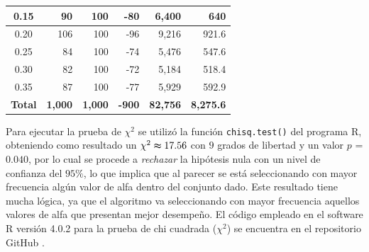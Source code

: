 \documentclass{article}
\begin{document}
\begin{table}
\begin{tabular}{|c|r|r|r|r|r|}
0.15                                 & 90                                                                             & 100                                                                           & -80                      & 6,400                          & 640                              \\ \hline
0.20                                 & 106                                                                            & 100                                                                           & -96                      & 9,216                          & 921.6                            \\ \hline
0.25                                 & 84                                                                             & 100                                                                           & -74                      & 5,476                          & 547.6                            \\ \hline
0.30                                 & 82                                                                             & 100                                                                           & -72                      & 5,184                          & 518.4                            \\ \hline
0.35                                 & 87                                                                             & 100                                                                           & -77                      & 5,929                          & 592.9                            \\ \hline
\multicolumn{1}{|l|}{\textbf{Total}} & \textbf{1,000}                                                                 & \textbf{1,000}                                                                  & \textbf{-900}            & \textbf{82,756}                & \textbf{8,275.6}                 \\ \hline
\end{tabular}
\label{tablacontingencia}
\end{table}

Para ejecutar la prueba de $\chi^{2}$ se utilizó la función \texttt{chisq.test()} del programa R, obteniendo como resultado un  $\chi^{2} \thickapprox 17.56$ con $9$ grados de libertad y un valor $p$ = $0.040$, por lo cual se procede a \textit{rechazar} la hipótesis nula con un nivel de confianza del $95\%$, lo que implica que al parecer se está seleccionando con mayor frecuencia algún valor de alfa dentro del conjunto dado. Este resultado tiene mucha lógica, ya que el algoritmo va seleccionando con mayor frecuencia aquellos valores de alfa que presentan mejor desempeño. El código empleado en el software R versión 4.0.2 para la prueba de chi cuadrada ($\chi^{2}$) se encuentra en el repositorio GitHub \cite{github}.
\end{document}
